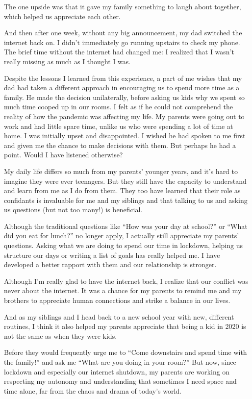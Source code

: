 The one upside was that it gave my family something to laugh about
together, which helped us appreciate each other.

And then after one week, without any big announcement, my dad switched
the internet back on. I didn't immediately go running upstairs to check
my phone. The brief time without the internet had changed me: I realized
that I wasn't really missing as much as I thought I was.

Despite the lessons I learned from this experience, a part of me wishes
that my dad had taken a different approach in encouraging us to spend
more time as a family. He made the decision unilaterally, before asking
us kids why we spent so much time cooped up in our rooms. I felt as if
he could not comprehend the reality of how the pandemic was affecting my
life. My parents were going out to work and had little spare time,
unlike us who were spending a lot of time at home. I was initially upset
and disappointed. I wished he had spoken to me first and given me the
chance to make decisions with them. But perhaps he had a point. Would I
have listened otherwise?

My daily life differs so much from my parents' younger years, and it's
hard to imagine they were ever teenagers. But they still have the
capacity to understand and learn from me as I do from them. They too
have learned that their role as confidants is invaluable for me and my
siblings and that talking to us and asking us questions (but not too
many!) is beneficial.

Although the traditional questions like ``How was your day at school?''
or ``What did you eat for lunch?'' no longer apply, I actually still
appreciate my parents' questions. Asking what we are doing to spend our
time in lockdown, helping us structure our days or writing a list of
goals has really helped me. I have developed a better rapport with them
and our relationship is stronger.

Although I'm really glad to have the internet back, I realize that our
conflict was never about the internet. It was a chance for my parents to
remind me and my brothers to appreciate human connections and strike a
balance in our lives.

And as my siblings and I head back to a new school year with new,
different routines, I think it also helped my parents appreciate that
being a kid in 2020 is not the same as when they were kids.

Before they would frequently urge me to ``Come downstairs and spend time
with the family!'' and ask me ``What are you doing in your room?'' But
now, since lockdown and especially our internet shutdown, my parents are
working on respecting my autonomy and understanding that sometimes I
need space and time alone, far from the chaos and drama of today's
world.


